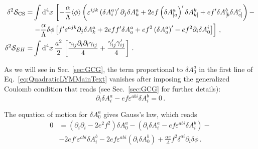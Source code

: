  \begin{align}
\delta^2 \mathcal{S}_{\rm CS}  = & \int \textrm{d}^4 x \, \left[-\frac{\alpha}{\Lambda} \langle \phi \rangle \left(\varepsilon^{ijk} \left(\delta A^a_i\right)' \partial_j \delta A^a_k + 2 e f \left(\delta A^a_{[a}\right)' \delta A^k_{k]} + e f'  \delta A^b_{[b} \delta A^c_{c]}  \right) - \right. \nonumber \\
& \left. - \frac{\alpha}{ \Lambda} \delta \phi \left[f' \varepsilon^{ajk}  \partial_j \delta A^a_k + 2 e f f' \delta A^a_a +  e f^2 \left(\delta A^a_a\right)' -  e f^2 \partial_i \delta A^i_0 \right]\right] \,,
\label{eq:CSQuadraticMainText} \\
\label{eq:EH_to_use}
\delta^2 \mathcal{S}_{EH}  = & \int \textrm{d}^4 x \, \frac{a^2}{2} \left[\frac{ \gamma_{ij} \partial_l \partial_l \gamma_{ij} }{4} + \frac{\gamma^\prime_{ij} \gamma^\prime_{ij}}{4} \right] \,. 
\end{align}

As we will see in Sec. \ref{sec:GCG}, the term proportional to $\delta A^a_0$ in the first line of Eq.~\eqref{eq:QuadraticLYMMainText} vanishes after imposing the generalized Coulomb condition that reads (see Sec.~\ref{sec:GCG} for further details):
\begin{equation}
\partial_i \delta A^a_i - e f \varepsilon^{abi} \delta A^b_i = 0 \,.
\end{equation}

The equation of motion for $\delta A^a_0$ gives Gauss's law, which reads
\begin{align}
\label{eq:GaussLaw}
0 & = \left(\partial_i \partial_i  - 2 e^2 f^2 \right) \delta A^a_{0} - \left(\partial_i \delta A^a_i - e f \varepsilon^{abi} \delta A^b_i\right) - \nonumber \\
& - 2 e f' \varepsilon^{abi} \delta A^b_i - 2 e f \varepsilon^{abi} \left(\partial_i \delta A^b_0\right) + \frac{\alpha e}{\Lambda} f^2 \delta^{ai} \partial_i \delta \phi \,.
\end{align}

